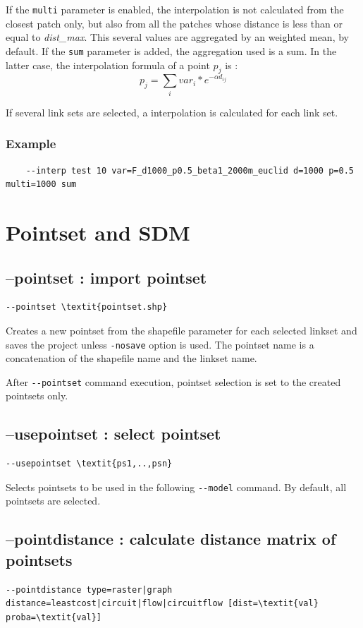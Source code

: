 \documentclass[a4paper,10pt]{report}
\begin{document}
If the \verb|multi| parameter is enabled, the interpolation is not calculated from the closest patch only, but also from all the patches whose distance is less than or equal to \textit{dist\_max}. This several values are aggregated by an weighted mean, by default. If the \verb|sum| parameter is added, the aggregation used is a sum. In the latter case, the interpolation formula of a point $p_j$ is :
$$p_j = \sum_i{var_i * e^{-\alpha d_{ij}}} $$

If several link sets are selected, a interpolation is calculated for each link set.

\subsubsection{Example}
\begin{Verbatim}
	--interp test 10 var=F_d1000_p0.5_beta1_2000m_euclid d=1000 p=0.5 multi=1000 sum
\end{Verbatim}


\section{Pointset and SDM}
\subsection{--pointset : import pointset}
\begin{Verbatim}[commandchars=\\\{\}]
--pointset \textit{pointset.shp}
\end{Verbatim}
Creates a new pointset from the shapefile parameter for each selected linkset and saves the project unless \verb|-nosave| option is used.
The pointset name is a concatenation of the shapefile name and the linkset name.

After \verb|--pointset| command execution, pointset selection is set to the created pointsets only.

\subsection{--usepointset : select pointset}
\begin{Verbatim}[commandchars=\\\{\}]
--usepointset \textit{ps1,..,psn}
\end{Verbatim}
Selects pointsets to be used in the following \verb|--model| command.
By default, all pointsets are selected.

\subsection{--pointdistance : calculate distance matrix of pointsets}
\begin{Verbatim}[commandchars=\\\{\}]
--pointdistance type=raster|graph distance=leastcost|circuit|flow|circuitflow [dist=\textit{val} proba=\textit{val}]
\end{Verbatim}
\end{document}
